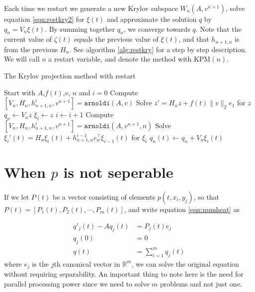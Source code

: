 Each time we restart we generate a new Krylov subspace $W_n(A,v^{n+1})$, solve equation \eqref{eqn:restkry2} for $\xi(t)$ and approximate the solution $q$ by $ q_n =  V_n\xi(t)$. By summing together $q_n$, we converge towards $q$. Note that the current value of $\zeta(t)$ equals the previous value of $\xi(t)$, and that $h_{n+1,n}$ is from the previous $H_n$. See algorithm \ref{alg:restkry} for a step by step description. We will call $n$ a restart variable, and denote the method with KPM$(n)$.
\begin{algorithm}
\begin{algorithmic} \caption{The Krylov projection method with restart} \label{alg:restkry} 
\STATE Start with $A$,$f(t)$,$v$, $n$ and $i = 0$
\STATE Compute $[V_n,H_n,h_{n+1,n}^i,v^{n+1}] = \texttt{arnoldi}(A,v)$
\STATE Solve $  z' = H_n z + f(t) \| v \|_2 e_1  $ for $z$
\STATE $ q_n \leftarrow  V_n z $
\STATE $\xi_i \leftarrow z$
    \STATE $i \leftarrow i + 1$
    \STATE Compute $[V_n,H_n,h_{n+1,n}^i,v^{n+1}] = \texttt{arnoldi}(A,v^{n+1},n)$
    \STATE Solve $ \xi_i'(t) = H_n \xi_i(t) + h_{n+1,n}^{i-1}e_n^\top \xi_{i-1}(t)  $ for $\xi_i$
    \STATE $ q_n(t) \leftarrow q_n + V_n \xi_i(t) $
\ENDWHILE
\end{algorithmic} 
\end{algorithm}

\section{When $p$ is not seperable} \label{sec:nonsep}
If we let $P(t)$ be a vector consisting of elements $p(t, x_i, y_j)$, so that $P(t) = [P_1(t),P_2(t),\cdots, P_m(t)]$, and write equation \eqref{eqn:numheat} as

\begin{equation}
\begin{aligned}
q'_j(t) -A q_j(t) &= P_j(t) e_j \\
q_j(0) &= 0\\
q(t) &= \sum \limits_{i = 1}^m q_j(t)
\end{aligned}
\end{equation}
where $e_j$ is the $j$th canonical vector in $\mathbb{R}^{m}$, we can solve the original equation without requiring separability. 
An important thing to note here is the need for parallel processing power since we need to solve $m$ problems and not just one.
